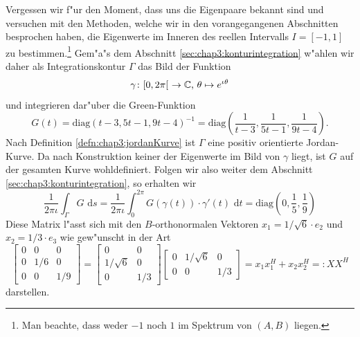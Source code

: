 Vergessen wir f"ur den Moment, dass uns die Eigenpaare bekannt sind und versuchen
mit den Methoden, welche wir in den vorangegangenen Abschnitten besprochen haben, die Eigenwerte im Inneren des reellen Intervalls $I = [-1,1]$ zu bestimmen.\footnote{Man beachte, dass weder $-1$ noch $1$ im Spektrum von $(A,B)$ liegen.}
Gem"a"s dem Abschnitt \ref{sec:chap3:konturintegration} w"ahlen wir daher als Integrationskontur $\Gamma$ das Bild der Funktion
\begin{equation}\label{kurve}
\gamma\colon [0,2\pi[\ \to\mathbb{C}\text{, }\theta\mapsto e^{\iota \theta}
\end{equation}
und integrieren dar"uber die Green-Funktion
\[
G(t) = \text{diag}(t-3, 5t-1, 9t-4)^{-1}
=\text{diag}\left(\frac{1}{t-3}, \frac{1}{5t-1}, \frac{1}{9t-4}\right).
\]
Nach Definition \ref{defn:chap3:jordanKurve} ist $\Gamma$ eine positiv orientierte Jordan-Kurve.
Da nach Konstruktion keiner der Eigenwerte im Bild von
$\gamma$ liegt, ist $G$ auf der gesamten Kurve wohldefiniert.
Folgen wir also weiter dem Abschnitt \ref{sec:chap3:konturintegration}, so erhalten wir
\[
\frac{1}{2\pi\iota} \int_\Gamma G \text{ d}s =
\frac{1}{2\pi\iota}\int_0^{2\pi} G(\gamma(t))\cdot \gamma'(t)
\text{ d}t
= \text{diag}\left( 0, \frac{1}{5}, \frac{1}{9} \right)
\]
Diese Matrix l"asst sich mit den $B$-orthonormalen Vektoren $x_1 = 1/\sqrt6 \cdot e_2$
und $x_2 = 1/3\cdot e_3$ wie gew"unscht in der Art
\[
\begin{bmatrix} 0 & 0 & 0 \\ 0 & 1/6 & 0 \\ 0 & 0 & 1/9 \end{bmatrix}
= \begin{bmatrix} 0 & 0  \\ 1/\sqrt6 & 0  \\ 0 & 1/3  \end{bmatrix}
\begin{bmatrix} 0 & 1/\sqrt6 & 0 \\ 0 & 0 & 1/3 \end{bmatrix} = x_1 x_1^H + x_2 x_2^H =: X X^H
\]
darstellen.

